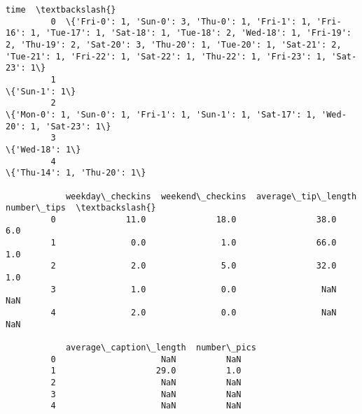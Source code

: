 \documentclass[11pt]{article}
\begin{document}
\begin{Verbatim}[commandchars=\\\{\}]
                                                                                                                                                                                                                                                                                     time  \textbackslash{}
         0  \{'Fri-0': 1, 'Sun-0': 3, 'Thu-0': 1, 'Fri-1': 1, 'Fri-16': 1, 'Tue-17': 1, 'Sat-18': 1, 'Tue-18': 2, 'Wed-18': 1, 'Fri-19': 2, 'Thu-19': 2, 'Sat-20': 3, 'Thu-20': 1, 'Tue-20': 1, 'Sat-21': 2, 'Tue-21': 1, 'Fri-22': 1, 'Sat-22': 1, 'Thu-22': 1, 'Fri-23': 1, 'Sat-23': 1\}   
         1                                                                                                                                                                                                                                                                   \{'Sun-1': 1\}   
         2                                                                                                                                                                                        \{'Mon-0': 1, 'Sun-0': 1, 'Fri-1': 1, 'Sun-1': 1, 'Sat-17': 1, 'Wed-20': 1, 'Sat-23': 1\}   
         3                                                                                                                                                                                                                                                                  \{'Wed-18': 1\}   
         4                                                                                                                                                                                                                                                     \{'Thu-14': 1, 'Thu-20': 1\}   
         
            weekday\_checkins  weekend\_checkins  average\_tip\_length  number\_tips  \textbackslash{}
         0              11.0              18.0                38.0          6.0   
         1               0.0               1.0                66.0          1.0   
         2               2.0               5.0                32.0          1.0   
         3               1.0               0.0                 NaN          NaN   
         4               2.0               0.0                 NaN          NaN   
         
            average\_caption\_length  number\_pics  
         0                     NaN          NaN  
         1                    29.0          1.0  
         2                     NaN          NaN  
         3                     NaN          NaN  
         4                     NaN          NaN  
\end{Verbatim}
            
\end{document}
